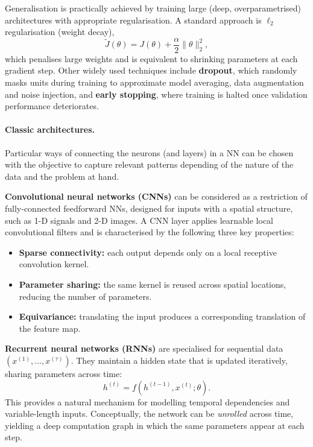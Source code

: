 \begin{remark}[Regularisation]
Generalisation is practically achieved by training large (deep, overparametrised) architectures with appropriate regularisation. A standard approach is $\ell_2$ regularisation (weight decay),
\[
\tilde{J}(\theta) = J(\theta) + \frac{\alpha}{2}\|\theta\|_2^2,
\]
which penalises large weights and is equivalent to shrinking parameters at each gradient step. Other widely used techniques include \textbf{dropout}, which randomly masks units during training to approximate model averaging, data augmentation and noise injection, and \textbf{early stopping}, where training is halted once validation performance deteriorates.
\end{remark}



\paragraph{Classic architectures.} Particular ways of connecting the neurons (and layers) in a NN can be chosen with the objective to capture relevant patterns depending of the nature of the data and the problem at hand.

\textbf{Convolutional neural networks (CNNs)} can be considered as a restriction of fully-connected feedforward NNs, designed for inputs with a spatial structure, such as 1-D signals and 2-D images. A CNN layer applies learnable local convolutional filters and is characterised by the following three key properties:
\begin{itemize}
  \item \textbf{Sparse connectivity:} each output depends only on a local receptive convolution kernel.
  \item \textbf{Parameter sharing:} the same kernel is reused across spatial locations, reducing the number of parameters.
  \item \textbf{Equivariance:} translating the input produces a corresponding translation of the feature map.
\end{itemize}


\textbf{Recurrent neural networks (RNNs)} are specialised for sequential data $(x^{(1)},\dots,x^{(\tau)})$. They maintain a hidden state that is updated iteratively, sharing parameters across time:
\begin{equation}
h^{(t)} = f\!\left(h^{(t-1)}, x^{(t)};\theta\right).
\end{equation}
This provides a natural mechanism for modelling temporal dependencies and variable-length inputs. Conceptually, the network can be \emph{unrolled} across time, yielding a deep computation graph in which the same parameters appear at each step.

